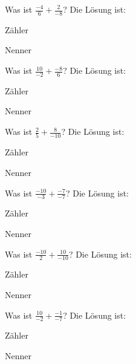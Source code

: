 \documentclass{ximera}
\begin{document}
\begin{shuffle}
\begin{question}
Was ist $\frac{-4}{6} + \frac{2}{-8}$?
Die Lösung ist:
\begin{solution}
Zähler 
\end{solution}
\begin{solution}
Nenner 
\end{solution}
\end{question}


\begin{question}
Was ist $\frac{10}{-2} + \frac{-8}{6}$?
Die Lösung ist:
\begin{solution}
Zähler 
\end{solution}
\begin{solution}
Nenner 
\end{solution}
\end{question}


\begin{question}
Was ist $\frac{2}{5} + \frac{8}{-10}$?
Die Lösung ist:
\begin{solution}
Zähler 
\end{solution}
\begin{solution}
Nenner 
\end{solution}
\end{question}


\begin{question}
Was ist $\frac{-10}{-3} + \frac{-7}{-7}$?
Die Lösung ist:
\begin{solution}
Zähler 
\end{solution}
\begin{solution}
Nenner 
\end{solution}
\end{question}


\begin{question}
Was ist $\frac{-10}{2} + \frac{10}{-10}$?
Die Lösung ist:
\begin{solution}
Zähler 
\end{solution}
\begin{solution}
Nenner 
\end{solution}
\end{question}


\begin{question}
Was ist $\frac{10}{-2} + \frac{-1}{-7}$?
Die Lösung ist:
\begin{solution}
Zähler 
\end{solution}
\begin{solution}
Nenner 
\end{solution}
\end{question}



\end{shuffle}
\end{document}
